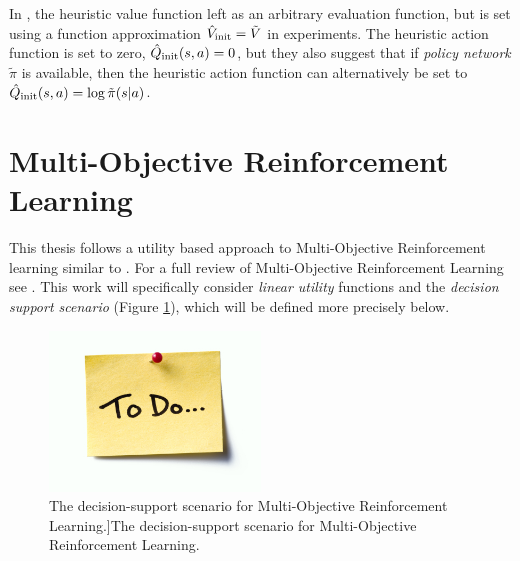         In \cite{ments}, the heuristic value function left as an arbitrary evaluation function, but is set using a function approximation ${\hat{V}_{\textnormal{init}}}=\tilde{V}$ in experiments. The heuristic action function is set to zero, ${\hat{Q}_{\textnormal{init}}}(s,a)=0$, but they also suggest that if \textit{policy network} $\tilde{\pi}$ is available, then the heuristic action function can alternatively be set to ${\hat{Q}_{\textnormal{init}}}(s,a)=\log \tilde{\pi}(s|a)$. 















\section{Multi-Objective Reinforcement Learning}
\label{sec:2-5-morl}





    This thesis follows a utility based approach to Multi-Objective Reinforcement learning similar to . For a full review of Multi-Objective Reinforcement Learning see . This work will specifically consider \textit{linear utility} functions and the \textit{decision support scenario} (Figure \ref{fig:mo_decision_support}), which will be defined more precisely below.

    \begin{figure}
        \centering\includegraphics[width=0.5\textwidth]{figures/todo.jpg} 
        \caption{The decision-support scenario for Multi-Objective Reinforcement Learning.]{The decision-support scenario for Multi-Objective Reinforcement Learning.}}
        \label{fig:mo_decision_support}
    \end{figure}

